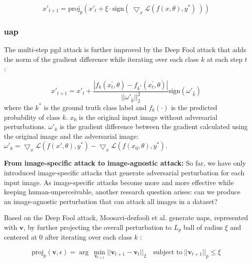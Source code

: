 \begin{equation}
x'_{t+1} = \text{proj}_{p}(x'_t + \xi \cdot \text{sign}(\ \bigtriangledown_x \mathcal{L}(f(x, \theta), y^*)\ ))
\end{equation}


\subsubsection{\acrfull{uap}}

The multi-step \acrshort{pgd} attack is further improved by the Deep Fool attack \citep{moosavi2016deepfool} that adds the norm of the gradient difference while iterating over each class $k$ at each step $t$:

\begin{equation}
x'_{t+1} = x'_t + \frac{|f_k(x^{'}_{t}, \theta) - f_{k^{*}}(x^{'}_{t}, \theta)|}{||\omega'_{\hat{k}}||^2_2} \text{sign}(\omega'_{\hat{k}})
\end{equation}
where the $k^*$ is the ground truth class label and $f_k(\cdot)$ is the predicted probability of class $k$. $x_0$ is the original input image without adversarial perturbations. $\omega'_k$ is the gradient difference between the gradient calculated using the original image and the adversarial image:  $\omega'_k = \bigtriangledown_x \mathcal{L}(f(x', \theta), y^*) - \bigtriangledown_x \mathcal{L}(f(x_0, \theta), y^*)$.

\textbf{From image-specific attack to image-agnostic attack:} So far, we have only introduced image-specific attacks that generate adversarial perturbation for each input image. As image-specific attacks become more and more effective while keeping human-unperceivable, another research question arises: can we produce an image-agnostic perturbation that can attack all images in a dataset?

Based on the Deep Fool attack, Moosavi-dezfooli et al. generate \acrshort{uap}s, represented with $\textbf{v}$, by further projecting the overall perturbation to $L_p$ ball of radius $\xi$ and centered at 0 after iterating over each class $k$ \citep{moosavi2017universal}:

\begin{equation}
\text{proj}_p(\textbf{v}, \epsilon)= \arg\ \underset{\textbf{v}_{t+1}}{\min}||\textbf{v}_{t+1} - \textbf{v}_{t}||_2 \quad \text{subject to}\ ||\textbf{v}_{t+1}||_p\leq\xi
\end{equation}

